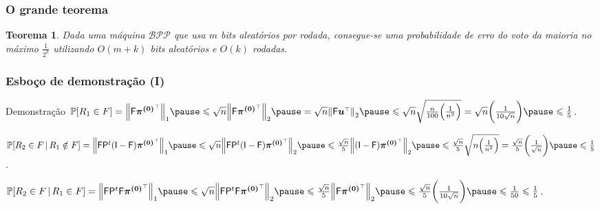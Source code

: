 \documentclass{beamer}
\def\Prob{\mathbb{P}} %
\def\leq{\leqslant} %
\def\clBPP{\mathcal{BPP}}
\def\vetor#1{\boldsymbol{#1}}
\def\matriz#1{\mathsf{#1}}
\def\norma#1#2{{\left\|{#2}\right\|}_{#1}}
\def\transp#1{{#1}^{\scriptscriptstyle \top}}
\theoremstyle{teoaxicorlem}
\newtheorem{Teo}{Teorema}
\theoremstyle{defnotnom}
\begin{document}
\begin{frame}
  \frametitle{O grande teorema}
  \begin{Teo}
    Dada uma máquina $\clBPP$ que usa $m$ \textit{bits} aleatórios por
    rodada, consegue-se uma probabilidade de erro do voto da maioria no
    máximo $\frac{1}{2^k}$ utilizando $O(m+k)$ \textit{bits} aleatórios
    e
    $O(k)$ rodadas.
  \end{Teo}
\end{frame}

\begin{frame}
  \frametitle{Esboço de demonstração (I)}
  \begin{block}{Demonstração}
    \footnotesize
    $\Prob[R_1\in F] = \norma1{\matriz F\transp{\vetor{\pi^{(0)}}}}\pause
    \leq \sqrt{n}\norma2{\matriz F\transp{\vetor{\pi^{(0)}}}}\pause
    = \sqrt{n}\norma2{\matriz F\transp{\vetor u}}\pause
    \leq \sqrt{n}\sqrt{\frac{n}{100}\Bigl(\frac{1}{n^2}\Bigr)}
    = \sqrt{n}\biggl(\frac{1}{10\sqrt n}\biggr) \pause
    \leq \frac15$.\pause

    $\Prob[R_2\in F\,|\,R_1\notin F]
    = \norma1{\matriz F{\matriz P}^t(\matriz I-\matriz F)
      \transp{\vetor{\pi^{(0)}}}}\pause
    \leq \sqrt{n}\norma2{\matriz F{\matriz P}^t(\matriz I-\matriz F)
      \transp{\vetor{\pi^{(0)}}}}\pause
    \leq \frac{\sqrt{n}}5\norma2{(\matriz I-\matriz F)
      \transp{\vetor{\pi^{(0)}}}}\pause
    \leq \frac{\sqrt{n}}5\sqrt{n\Bigl(\frac{1}{n^2}\Bigr)}
    = \frac{\sqrt{n}}5\biggl(\frac{1}{\sqrt n}\biggr) \pause
    \leq \frac15$.

    $\Prob[R_2\in F\,|\,R_1\in F]
    = \norma1{\matriz F{\matriz P}^t\matriz F
      \transp{\vetor{\pi^{(0)}}}}\pause
    \leq \sqrt{n}\norma2{\matriz F{\matriz P}^t\matriz F
      \transp{\vetor{\pi^{(0)}}}}\pause
    \leq \frac{\sqrt{n}}5\norma2{\matriz F
      \transp{\vetor{\pi^{(0)}}}}\pause
    \leq \frac{\sqrt{n}}5\biggl(\frac{1}{10\sqrt n}\biggr) \pause
    \leq \frac1{50} \leq\frac15$.
  \end{block}
\end{frame}
\end{document}
